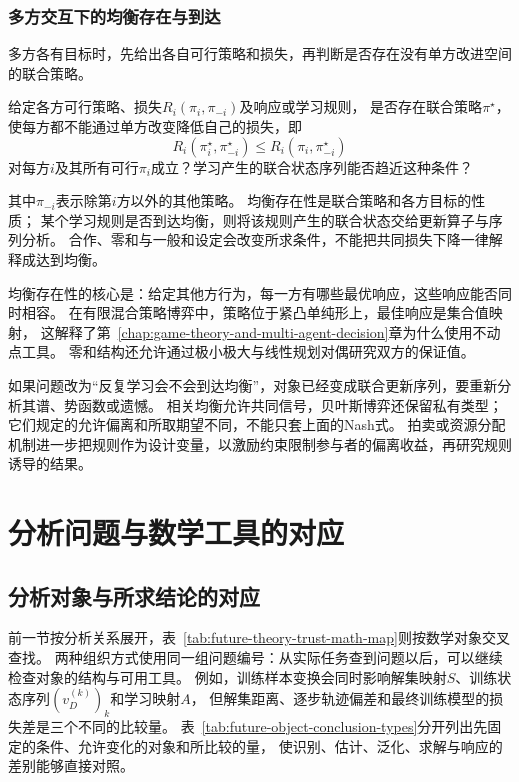 \subsubsection{多方交互下的均衡存在与到达}
\label{sec:future-analysis-equilibrium}

多方各有目标时，先给出各自可行策略和损失，再判断是否存在没有单方改进空间的联合策略。

\begin{mathproblem}[多方响应能否达到所求均衡]
  \label{question:future-equilibrium}
  给定各方可行策略、损失$R_i(\pi_i,\pi_{-i})$及响应或学习规则，
  是否存在联合策略$\pi^\star$，使每方都不能通过单方改变降低自己的损失，即
  \[
    R_i(\pi_i^\star,\pi_{-i}^\star)
    \leq R_i(\pi_i,\pi_{-i}^\star)
  \]
  对每方$i$及其所有可行$\pi_i$成立？学习产生的联合状态序列能否趋近这种条件？
\end{mathproblem}

其中$\pi_{-i}$表示除第$i$方以外的其他策略。
均衡存在性是联合策略和各方目标的性质；
某个学习规则是否到达均衡，则将该规则产生的联合状态交给更新算子与序列分析。
合作、零和与一般和设定会改变所求条件，不能把共同损失下降一律解释成达到均衡。

均衡存在性的核心是：给定其他方行为，每一方有哪些最优响应，这些响应能否同时相容。
在有限混合策略博弈中，策略位于紧凸单纯形上，最佳响应是集合值映射，
这解释了第~\ref{chap:game-theory-and-multi-agent-decision}章为什么使用不动点工具。
零和结构还允许通过极小极大与线性规划对偶研究双方的保证值。

如果问题改为“反复学习会不会到达均衡”，对象已经变成联合更新序列，要重新分析其谱、势函数或遗憾。
相关均衡允许共同信号，贝叶斯博弈还保留私有类型；它们规定的允许偏离和所取期望不同，不能只套上面的Nash式。
拍卖或资源分配机制进一步把规则作为设计变量，以激励约束限制参与者的偏离收益，再研究规则诱导的结果。

\section{分析问题与数学工具的对应}
\label{sec:future-mathematical-tool-roles}

\subsection{分析对象与所求结论的对应}
\label{sec:future-object-conclusion-correspondence}

前一节按分析关系展开，表~\ref{tab:future-theory-trust-math-map}则按数学对象交叉查找。
两种组织方式使用同一组问题编号：从实际任务查到问题以后，可以继续检查对象的结构与可用工具。
例如，训练样本变换会同时影响解集映射$S$、训练状态序列$(v_D^{(k)})_k$和学习映射$A$，
但解集距离、逐步轨迹偏差和最终训练模型的损失差是三个不同的比较量。
表~\ref{tab:future-object-conclusion-types}分开列出先固定的条件、允许变化的对象和所比较的量，
使识别、估计、泛化、求解与响应的差别能够直接对照。

